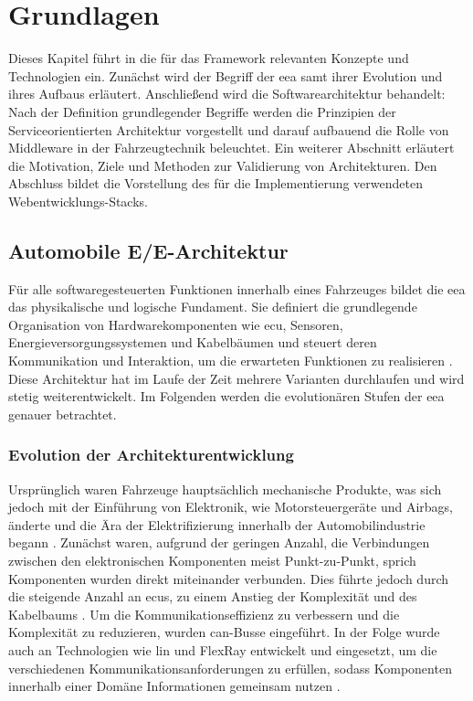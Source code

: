 \chapter{Grundlagen}
\label{sect:basics}

Dieses Kapitel führt in die für das Framework relevanten Konzepte und Technologien ein. Zunächst wird der Begriff der \gls{eea} samt ihrer Evolution und ihres Aufbaus erläutert. Anschließend wird die Softwarearchitektur behandelt: Nach der Definition grundlegender Begriffe werden die Prinzipien der Serviceorientierten Architektur vorgestellt und darauf aufbauend die Rolle von Middleware in der Fahrzeugtechnik beleuchtet. Ein weiterer Abschnitt erläutert die Motivation, Ziele und Methoden zur Validierung von Architekturen. Den Abschluss bildet die Vorstellung des für die Implementierung verwendeten Webentwicklungs-Stacks.


\section{Automobile E/E-Architektur}
\label{sect:eearchitecture}

Für alle softwaregesteuerten Funktionen innerhalb eines Fahrzeuges bildet die \gls{eea} das physikalische und logische Fundament. Sie definiert die grundlegende Organisation von Hardwarekomponenten wie \gls{ecu}, Sensoren, Energieversorgungssystemen und Kabelbäumen und steuert deren Kommunikation und Interaktion, um die erwarteten Funktionen zu realisieren \cite{jiang2019vehicle}. Diese Architektur hat im Laufe der Zeit mehrere Varianten durchlaufen und wird stetig weiterentwickelt. Im Folgenden werden die evolutionären Stufen der \gls{eea} genauer betrachtet.

\subsection*{Evolution der Architekturentwicklung}

Ursprünglich waren Fahrzeuge hauptsächlich mechanische Produkte, was sich jedoch mit der Einführung von Elektronik, wie Motorsteuergeräte und Airbags, änderte und die Ära der Elektrifizierung innerhalb der Automobilindustrie begann \cite{jiang2019vehicle}\cite{zhuRequirementsDrivenAutomotiveElectrical2021}. Zunächst waren, aufgrund der geringen Anzahl, die Verbindungen zwischen den elektronischen Komponenten meist Punkt-zu-Punkt, sprich Komponenten wurden direkt miteinander verbunden. Dies führte jedoch durch die steigende Anzahl an \glspl{ecu}, zu einem Anstieg der Komplexität und des Kabelbaums \cite{wang2024review}. Um die Kommunikationseffizienz zu verbessern und die Komplexität zu reduzieren, wurden \gls{can}-Busse eingeführt. In der Folge wurde auch an Technologien wie \gls{lin} und FlexRay entwickelt und eingesetzt, um die verschiedenen Kommunikationsanforderungen zu erfüllen, sodass Komponenten innerhalb einer Domäne Informationen gemeinsam nutzen \cite{wang2024review}\cite{zhuRequirementsDrivenAutomotiveElectrical2021}.

